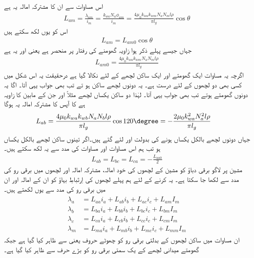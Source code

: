 اس مساوات سے ان کا مشترکہ امالہ  یہ ہے 
\begin{align}
L_{am}=\frac{\lambda_{am}}{i_m}=\frac{k_{wa} N_a \phi_{am}}{i_m}=\frac{4 \mu_0 k_{wa} k_{wm} N_a N_m l \rho}{\pi l_g} \cos \theta
\end{align}
اس کو یوں لکھ سکتے ہیں
\begin{align}
L_{am}=L_{am0} \cos \theta
\end{align}
جہاں جیسے پہلے ذکر ہوا زاویہ  گھومنے کی رفتار پر منحصر ہے یعنی   اور   یہ ہے
\begin{align}
L_{am0}=\frac{4 \mu_0 k_{wa} k_{wm} N_a N_m l \rho}{\pi l_g} 
\end{align}
اگرچہ یہ مساوات ایک گھومتے اور ایک ساکن لچھے کے لئے نکالا گیا ہے درحقیقت یہ اس شکل میں کسی بھی دو لچھوں کے لئے درست ہے۔ یہ دونوں لچھے ساکن ہو تے تب بھی جواب یہی آتا۔ اگا یہ دونوں گھومتے ہوتے تب بھی جواب یہی آتا۔ لہٰذا دو ساکن  یکساں لچھے مثلاً  اور  جن کے مابین  کا زاویہ ہے کا آپس کا مشترکہ امالہ یہ ہوگا
\begin{align}
L_{ab}&=\frac{4 \mu_0 k_{wa} k_{wb} N_a N_b l \rho}{\pi l_g} \cos 120\degree=-\frac{2 \mu_0 k_{wa}^2  N_a^2 l \rho}{\pi l_g}
\end{align}
جہاں دونوں لچھے بالکل یکساں ہونے کی بدولت   اور  لئے گئے ہیں۔اگر تینوں ساکن لچھے بالکل یکساں ہو تب ہم اس مساوات اور مساوات کی مدد سے یہ لکھ سکتے ہیں۔ 
\begin{align}
L_{ab}=L_{bc}=L_{ca}=-\frac{L_{aa0}}{2}
\end{align}
%
مشین پر لاگو برقی دباؤ کو مشین کے لچھوں کی خود امالہ، مشترکہ امالہ اور لچھوں میں برقی رو کی مدد سے لکھا جا سکتا ہے۔ یہ کرنے کے لئے ہم پہلے  لچھوں کی اِرتَباطِ بہاؤ  کو ان کے امالہ اور ان میں برقی رو کی مدد سے یوں لکھتے ہیں۔
\begin{gather}
\begin{aligned}
\lambda_a&=L_{aa} i_a+L_{ab} i_b +L_{ac} i_c+L_{am} I_m\\
\lambda_b&=L_{ba} i_a+L_{bb} i_b +L_{bc} i_c+L_{bm} I_m\\
\lambda_c&=L_{ca} i_a+L_{cb} i_b +L_{cc} i_c+L_{cm} I_m\\
\lambda_m&=L_{ma} i_a+L_{mb} i_b +L_{mc} i_c+L_{mm} I_m
\end{aligned}
\end{gather}
ان مساوات میں ساکن لچھوں کے بدلتی برقی رو  کو چھوٹے حروف یعنی  سے ظاہر کیا گیا ہے جبکہ گھومتے میدانی لچھے کے یک سمتی برقی رو کو بڑے حرف   سے ظاہر کیا گیا ہے۔

